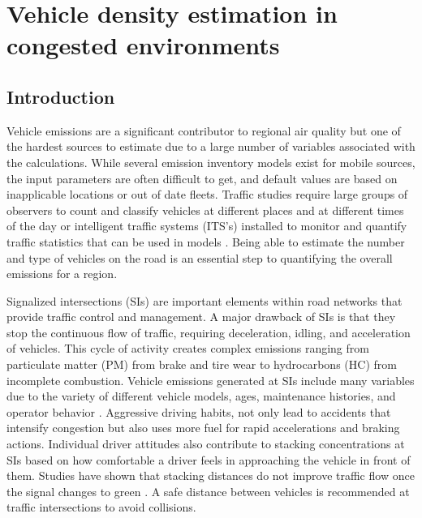 \chapter{Vehicle density estimation in congested environments}

\section{Introduction}

Vehicle emissions are a significant contributor to regional air quality but one of the hardest sources to estimate due to a large number of variables associated with the calculations. While several emission inventory models exist for mobile sources, the input parameters are often difficult to get, and default values are based on inapplicable locations or out of date fleets. Traffic studies require large groups of observers to count and classify vehicles at different places and at different times of the day or intelligent traffic systems (ITS's) installed to monitor and quantify traffic statistics that can be used in models \citep{Suzuki2015}. Being able to estimate the number and type of vehicles on the road is an essential step to quantifying the overall emissions for a region. 

Signalized intersections (SIs) are important elements within road networks that provide traffic control and management. A major drawback of SIs is that they stop the continuous flow of traffic, requiring deceleration, idling, and acceleration of vehicles. This cycle of activity creates complex emissions ranging from particulate matter (PM) from brake and tire wear to hydrocarbons (HC) from incomplete combustion. Vehicle emissions generated at SIs include many variables due to the variety of different vehicle models, ages, maintenance histories, and operator behavior \citep{Freeman2015a, Li2009}. Aggressive driving habits, not only lead to accidents that intensify congestion but also uses more fuel for rapid accelerations and braking actions. Individual driver attitudes also contribute to stacking concentrations at SIs based on how comfortable a driver feels in approaching the vehicle in front of them. Studies have shown that stacking distances do not improve traffic flow once the signal changes to green  \citep{Ahmadi2017}. A safe distance between vehicles is recommended at traffic intersections to avoid collisions.

